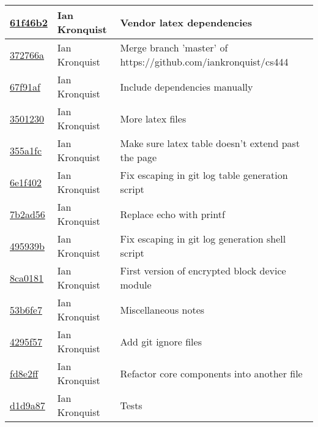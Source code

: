 \documentclass[10pt,conference,draftclsnofoot,onecolumn]{IEEEtran}
\begin{document}
\begin{tabular}{l l l}
\href{git@github.com:iankronquist/cs444/commit/61f46b28903ed766bb4474c22bb43f07329e847a}{61f46b2} & Ian Kronquist & Vendor latex dependencies\\\hline
\href{git@github.com:iankronquist/cs444/commit/372766a3af5cebe7bcb0e19526e703ead5546e24}{372766a} & Ian Kronquist & Merge branch 'master' of https://github.com/iankronquist/cs444\\\hline
\href{git@github.com:iankronquist/cs444/commit/67f91af6cfce11662d5e2e5d79abef1fe25ba588}{67f91af} & Ian Kronquist & Include dependencies manually\\\hline
\href{git@github.com:iankronquist/cs444/commit/35012305f5307c9f4cbeda825f8ac55bf231a3c8}{3501230} & Ian Kronquist & More latex files\\\hline
\href{git@github.com:iankronquist/cs444/commit/355a1fc34c346abd2dd0e306bc62267eea41bdff}{355a1fc} & Ian Kronquist & Make sure latex table doesn't extend past the page\\\hline
\href{git@github.com:iankronquist/cs444/commit/6e1f40269ebc2fa5277338f092d784355cba9864}{6e1f402} & Ian Kronquist & Fix escaping in git log table generation script\\\hline
\href{git@github.com:iankronquist/cs444/commit/7b2ad566e48c9c5483a6105728765c15b7497051}{7b2ad56} & Ian Kronquist & Replace echo with printf\\\hline
\href{git@github.com:iankronquist/cs444/commit/495939bec91e9233f6151a616d0811425470235e}{495939b} & Ian Kronquist & Fix escaping in git log generation shell script\\\hline
\href{git@github.com:iankronquist/cs444/commit/8ca0181ad52664f27ee80fb2829e1702c4334cfe}{8ca0181} & Ian Kronquist & First version of encrypted block device module\\\hline
\href{git@github.com:iankronquist/cs444/commit/53b6fe7ae70719a16a0c6b4e50ec72dd582ff989}{53b6fe7} & Ian Kronquist & Miscellaneous notes\\\hline
\href{git@github.com:iankronquist/cs444/commit/4295f57ebb82a2167c116d54306ab041a4c55ffa}{4295f57} & Ian Kronquist & Add git ignore files\\\hline
\href{git@github.com:iankronquist/cs444/commit/fd8e2ff3420b4410d9bac99406076c794f2e25ab}{fd8e2ff} & Ian Kronquist & Refactor core components into another file\\\hline
\href{git@github.com:iankronquist/cs444/commit/d1d9a87e0ed0365bb0c830ba279a2cb0d8eb0192}{d1d9a87} & Ian Kronquist & Tests\\\hline
\end{tabular}


\clearpage
\printbibliography
\end{document}
